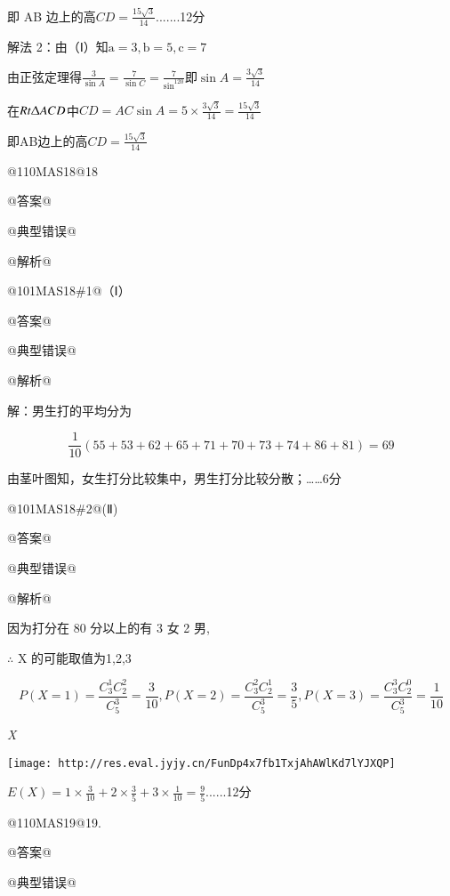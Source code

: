 \documentclass{scrbook}
\begin{document}
即 AB 边上的高$CD=\frac{15\sqrt{3}}{14}$.......12分

解法 2：由（Ⅰ）知$\mathrm{a}=3,\mathrm{b}=5,\mathrm{c}=7$

由正弦定理得$\frac{3}{\sin A}=\frac{7}{\sin C}=\frac{7}{\sin ^{120}}$即$\sin A=\frac{3\sqrt{3}}{14}$

在$Rt\Updelta ACD$中$CD=AC\sin A=5\times \frac{3\sqrt{3}}{14}=\frac{15\sqrt{3}}{14}$

即AB边上的高$CD=\frac{15\sqrt{3}}{14}$\raisebox{-12pt}{{\ldots}{\ldots}}\raisebox{-12pt}{12分}

@110MA{\textbar}S18@18

@答案@

@典型错误@

@解析@

@101MA{\textbar}S18\#1@（Ⅰ）

@答案@

@典型错误@

@解析@

解：男生打的平均分为

\begin{equation*}
\frac{1}{10}(55+53+62+65+71+70+73+74+86+81)=69
\end{equation*}

由茎叶图知，女生打分比较集中，男生打分比较分散；{\ldots}{\ldots}6分

@101MA{\textbar}S18\#2@(Ⅱ)

@答案@

@典型错误@

@解析@

因为打分在 80 分以上的有 3 女 2 男,

${\therefore}$ X 的可能取值为1,2,3

\begin{equation*}
P(X=1)=\frac{C_{3}^{1}C_{2}^{2}}{C_{5}^{3}}=\frac{3}{10},P(X=2)=\frac{C_{3}^{2}C_{2}^{1}}{C_{5}^{3}}=\frac{3}{5},P(X=3)=\frac{C_{3}^{3}C_{2}^{0}}{C_{5}^{3}}=\frac{1}{10}
\end{equation*}

\raisebox{0.5pt}{${\therefore}$} \textit{X} \raisebox{0.5pt}{的分布列为}

\texttt{[image: http://res.eval.jyjy.cn/FunDp4x7fb1TxjAhAWlKd7lYJXQP]}

$E(X)=1\times \frac{3}{10}+2\times \frac{3}{5}+3\times \frac{1}{10}=\frac{9}{5}$......12分

@110MA{\textbar}S19@19.

@答案@

@典型错误@
\end{document}
